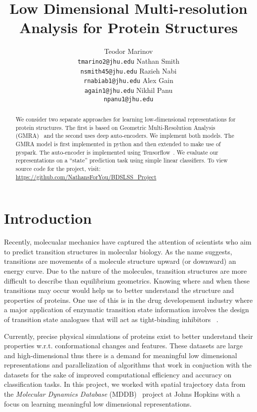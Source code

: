 \documentclass{article}
\title{Low Dimensional Multi-resolution Analysis for Protein Structures}
\author{
  Teodor Marinov\\
  \texttt{tmarino2@jhu.edu} \And
  Nathan Smith\\
  \texttt{nsmith45@jhu.edu} \And
  Razieh Nabi\\
  \texttt{rnabiab1@jhu.edu} \And
  Alex Gain\\
  \texttt{again1@jhu.edu} \And
  Nikhil Panu\\
  \texttt{npanu1@jhu.edu}
}
\begin{document}

\maketitle

\begin{abstract}
  We consider two separate approaches for learning low-dimensional representations for protein structures. The first is based on Geometric Multi-Resolution Analysis (GMRA)~\cite{allard2012multi} and the second uses deep auto-encoders. We implement both models. The GMRA model is first implemented in python and then extended to make use of pyspark. The auto-encoder is implemented using Tensorflow~\cite{abadi2016tensorflow}. We evaluate our representations on a ``state'' prediction task using simple linear classifiers. To view source code for the project, visit: \url{https://github.com/NathansForYou/BDSLSS_Project}
\end{abstract}

\section{Introduction}
Recently, molecualar mechanics have captured the attention of scientists who aim to predict transition structures in molecular biology. As the name suggests, transitions are movements of a molecule structure upward (or downward) an energy curve. Due to the nature of the molecules, transition structures are more difficult to describe than equilibrium geometrics. %
Knowing where and when these transitions may occur would help us to better understand the structure and properties of proteins. One use of this is in the drug developement industry where a major application of enzymatic transition state information involves the design of transition state analogues that will act as tight-binding inhibitors ~\cite{Schramm}. 

Currently, precise physical simulations of proteins exist to better understand their properties w.r.t. conformational changes and features. These datasets are large and high-dimensional thus there is a demand for meaningful low dimensional representations and parallelization of algorithms that work in conjuction with the datasets for the sake of improved computational efficiency and accuracy on classification tasks. In this project, we worked with spatial trajectory data from the \textit{Molecular Dynamics Database} (MDDB)~\cite{Nutanong:2013:AEL:2484838.2484872} project at Johns Hopkins with a focus on learning meaningful low dimensional representations.
\end{document}
